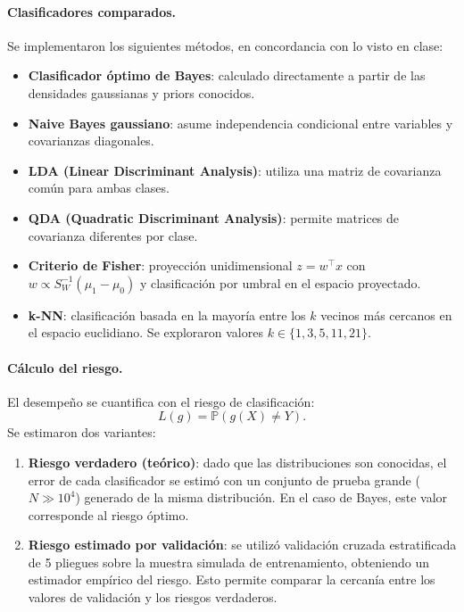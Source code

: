 \documentclass[10pt]{article}
\begin{document}
\paragraph{Clasificadores comparados.}
Se implementaron los siguientes métodos, en concordancia con lo visto en clase:
\begin{itemize}
    \item \textbf{Clasificador óptimo de Bayes}: calculado directamente a partir de las densidades gaussianas y priors conocidos.
    \item \textbf{Naive Bayes gaussiano}: asume independencia condicional entre variables y covarianzas diagonales.
    \item \textbf{LDA (Linear Discriminant Analysis)}: utiliza una matriz de covarianza común para ambas clases.
    \item \textbf{QDA (Quadratic Discriminant Analysis)}: permite matrices de covarianza diferentes por clase.
    \item \textbf{Criterio de Fisher}: proyección unidimensional $z=w^\top x$ con $w \propto S_W^{-1}(\mu_1 - \mu_0)$ y clasificación por umbral en el espacio proyectado.
    \item \textbf{k-NN}: clasificación basada en la mayoría entre los $k$ vecinos más cercanos en el espacio euclidiano. Se exploraron valores $k \in \{1, 3, 5, 11, 21\}$.
\end{itemize}

\paragraph{Cálculo del riesgo.}
El desempeño se cuantifica con el riesgo de clasificación:
\[
L(g) = \mathbb{P}(g(X) \neq Y).
\]
Se estimaron dos variantes:
\begin{enumerate}
    \item \textbf{Riesgo verdadero (teórico)}: dado que las distribuciones son conocidas, el error de cada clasificador se estimó con un conjunto de prueba grande ($N \gg 10^4$) generado de la misma distribución. En el caso de Bayes, este valor corresponde al riesgo óptimo.
    \item \textbf{Riesgo estimado por validación}: se utilizó validación cruzada estratificada de 5 pliegues sobre la muestra simulada de entrenamiento, obteniendo un estimador empírico del riesgo. Esto permite comparar la cercanía entre los valores de validación y los riesgos verdaderos.
\end{enumerate}
\end{document}
